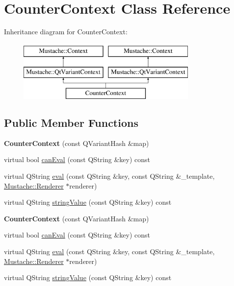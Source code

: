 \hypertarget{classCounterContext}{\section{Counter\-Context Class Reference}
\label{classCounterContext}
}
Inheritance diagram for Counter\-Context\-:\begin{figure}[H]
\begin{center}
\leavevmode
\includegraphics[height=3.000000cm]{db/da6/classCounterContext}
\end{center}
\end{figure}
\subsection*{Public Member Functions}
\begin{DoxyCompactItemize}
\item 
\hypertarget{classCounterContext_a05c70666c806b2cd888c24f5edae8d87}{{\bfseries Counter\-Context} (const Q\-Variant\-Hash \&map)}\label{classCounterContext_a05c70666c806b2cd888c24f5edae8d87}

\item 
virtual bool \hyperlink{classCounterContext_a2b2c8d5bbd329e20ce6e16be72676291}{can\-Eval} (const Q\-String \&key) const 
\item 
virtual Q\-String \hyperlink{classCounterContext_a01764884d5bdbe014b8e569c10c82e99}{eval} (const Q\-String \&key, const Q\-String \&\-\_\-template, \hyperlink{classMustache_1_1Renderer}{Mustache\-::\-Renderer} $\ast$renderer)
\item 
virtual Q\-String \hyperlink{classCounterContext_adb984d696efcc32abaaf0aaeade4f8b8}{string\-Value} (const Q\-String \&key) const 
\item 
\hypertarget{classCounterContext_a05c70666c806b2cd888c24f5edae8d87}{{\bfseries Counter\-Context} (const Q\-Variant\-Hash \&map)}\label{classCounterContext_a05c70666c806b2cd888c24f5edae8d87}

\item 
virtual bool \hyperlink{classCounterContext_a2b2c8d5bbd329e20ce6e16be72676291}{can\-Eval} (const Q\-String \&key) const 
\item 
virtual Q\-String \hyperlink{classCounterContext_a01764884d5bdbe014b8e569c10c82e99}{eval} (const Q\-String \&key, const Q\-String \&\-\_\-template, \hyperlink{classMustache_1_1Renderer}{Mustache\-::\-Renderer} $\ast$renderer)
\item 
virtual Q\-String \hyperlink{classCounterContext_adb984d696efcc32abaaf0aaeade4f8b8}{string\-Value} (const Q\-String \&key) const 
\end{DoxyCompactItemize}
